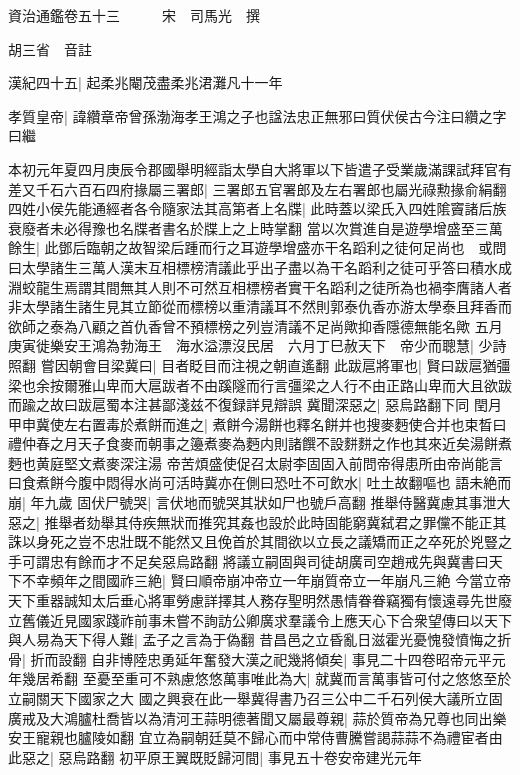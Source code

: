 資治通鑑卷五十三　　　宋　司馬光　撰

胡三省　音註

漢紀四十五|{
	起柔兆閹茂盡柔兆涒灘凡十一年}


孝質皇帝|{
	諱纘章帝曾孫渤海孝王鴻之子也諡法忠正無邪曰質伏侯古今注曰纘之字曰繼}


本初元年夏四月庚辰令郡國舉明經詣太學自大將軍以下皆遣子受業歲滿課試拜官有差又千石六百石四府掾屬三署郎|{
	三署郎五官署郎及左右署郎也屬光祿勲掾俞絹翻}
四姓小侯先能通經者各令隨家法其高第者上名牒|{
	此時蓋以梁氏入四姓隂竇諸后族衰廢者未必得豫也名牒者書名於牒上之上時掌翻}
當以次賞進自是遊學增盛至三萬餘生|{
	此鄧后臨朝之故智梁后踵而行之耳遊學增盛亦干名蹈利之徒何足尚也　或問曰太學諸生三萬人漢末互相標榜清議此乎出子盡以為干名蹈利之徒可乎答曰積水成淵蛟龍生焉謂其間無其人則不可然互相標榜者實干名蹈利之徒所為也禍李膺諸人者非太學諸生諸生見其立節從而標榜以重清議耳不然則郭泰仇香亦游太學泰且拜香而欲師之泰為八顧之首仇香曾不預標榜之列豈清議不足尚歟抑香隱德無能名歟}
五月庚寅徙樂安王鴻為勃海王　海水溢漂沒民居　六月丁巳赦天下　帝少而聰慧|{
	少詩照翻}
嘗因朝會目梁冀曰|{
	目者眨目而注視之朝直遙翻}
此跋扈將軍也|{
	賢曰跋扈猶彊梁也余按爾雅山卑而大扈跋者不由蹊隧而行言彊梁之人行不由正路山卑而大且欲跋而踰之故曰跋扈蜀本注甚鄙淺兹不復録詳見辯誤}
冀聞深惡之|{
	惡烏路翻下同}
閏月甲申冀使左右置毒於煮餅而進之|{
	煮餅今湯餅也釋名餅并也搜麥麪使合并也束晳曰禮仲春之月天子食麥而朝事之籩煮麥為麪内則諸饌不設䴵䴵之作也其來近矣湯餅煮麪也黄庭堅文煮麥深注湯}
帝苦煩盛使促召太尉李固固入前問帝得患所由帝尚能言曰食煮餅今腹中悶得水尚可活時冀亦在側曰恐吐不可飲水|{
	吐土故翻嘔也}
語未絶而崩|{
	年九歲}
固伏尸號哭|{
	言伏地而號哭其狀如尸也號戶高翻}
推舉侍醫冀慮其事泄大惡之|{
	推舉者劾舉其侍疾無狀而推究其姦也設於此時固能窮冀弑君之罪儻不能正其誅以身死之豈不忠壯既不能然又且俛首於其間欲以立長之議矯而正之卒死於兇豎之手可謂忠有餘而才不足矣惡烏路翻}
將議立嗣固與司徒胡廣司空趙戒先與冀書曰天下不幸頻年之間國祚三絶|{
	賢曰順帝崩冲帝立一年崩質帝立一年崩凡三絶}
今當立帝天下重器誠知太后垂心將軍勞慮詳擇其人務存聖明然愚情眷眷竊獨有懷遠尋先世廢立舊儀近見國家踐祚前事未嘗不詢訪公卿廣求羣議令上應天心下合衆望傳曰以天下與人易為天下得人難|{
	孟子之言為于偽翻}
昔昌邑之立昏亂日滋霍光憂愧發憤悔之折骨|{
	折而設翻}
自非博陸忠勇延年奮發大漢之祀幾將傾矣|{
	事見二十四卷昭帝元平元年幾居希翻}
至憂至重可不熟慮悠悠萬事唯此為大|{
	就冀而言萬事皆可付之悠悠至於立嗣關天下國家之大}
國之興衰在此一舉冀得書乃召三公中二千石列侯大議所立固廣戒及大鴻臚杜喬皆以為清河王蒜明德著聞又屬最尊親|{
	蒜於質帝為兄尊也同出樂安王寵親也臚陵如翻}
宜立為嗣朝廷莫不歸心而中常侍曹騰嘗謁蒜蒜不為禮宦者由此惡之|{
	惡烏路翻}
初平原王翼既貶歸河間|{
	事見五十卷安帝建光元年}
